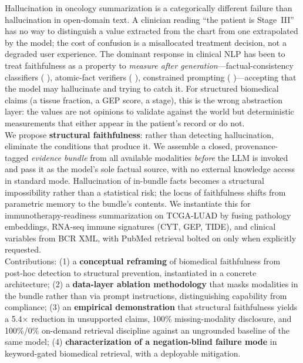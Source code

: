 \documentclass[11pt]{article}
\begin{document}
Hallucination in oncology summarization is a categorically different failure than hallucination in open-domain text. A clinician reading ``the patient is Stage~III'' has no way to distinguish a value extracted from the chart from one extrapolated by the model; the cost of confusion is a misallocated treatment decision, not a degraded user experience. The dominant response in clinical NLP has been to treat faithfulness as a property to \emph{measure after generation}—factual-consistency classifiers (\citeauthor{kryscinski2020evaluating} \citeyear{kryscinski2020evaluating}), atomic-fact verifiers (\citeauthor{min2023factscore} \citeyear{min2023factscore}), constrained prompting (\citeauthor{rawte2023survey} \citeyear{rawte2023survey})—accepting that the model may hallucinate and trying to catch it. For structured biomedical claims (a tissue fraction, a GEP score, a stage), this is the wrong abstraction layer: the values are not opinions to validate against the world but deterministic measurements that either appear in the patient's record or do not. \\
\indent We propose \textbf{structural faithfulness}: rather than detecting hallucination, eliminate the conditions that produce it. We assemble a closed, provenance-tagged \emph{evidence bundle} from all available modalities \emph{before} the LLM is invoked and pass it as the model's sole factual source, with no external knowledge access in standard mode. Hallucination of in-bundle facts becomes a structural impossibility rather than a statistical risk; the locus of faithfulness shifts from parametric memory to the bundle's contents. We instantiate this for immunotherapy-readiness summarization on TCGA-LUAD by fusing pathology embeddings, RNA-seq immune signatures (CYT, GEP, TIDE), and clinical variables from BCR XML, with PubMed retrieval bolted on only when explicitly requested. \\
\indent Contributions: (1) a \textbf{conceptual reframing} of biomedical faithfulness from post-hoc detection to structural prevention, instantiated in a concrete architecture; (2) a \textbf{data-layer ablation methodology} that masks modalities in the bundle rather than via prompt instructions, distinguishing capability from compliance; (3) an \textbf{empirical demonstration} that structural faithfulness yields a 5.4$\times$ reduction in unsupported claims, 100\% missing-modality disclosure, and 100\%/0\% on-demand retrieval discipline against an ungrounded baseline of the same model; (4) \textbf{characterization of a negation-blind failure mode} in keyword-gated biomedical retrieval, with a deployable mitigation.
\end{document}
